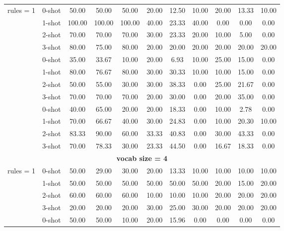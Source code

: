 \begin{table*}[t]
{\begin{tabular}{l c ccc ccc ccc}
           \midrule
           \multirow{4}{*}{rules = 1} & 0-shot & 50.00 & 50.00 & 50.00 & 20.00 & 12.50 & 10.00 & 20.00 & 13.33 & 10.00\\
           & 1-shot & 100.00 & 100.00 & 100.00 & 40.00 & 23.33 & 40.00 & 0.00 & 0.00 & 0.00\\
           & 2-shot & 70.00 & 70.00 & 70.00 & 30.00 & 23.33 & 20.00 & 10.00 & 5.00 & 0.00\\
           & 3-shot & 80.00 & 75.00 & 80.00 & 20.00 & 20.00 & 20.00 & 20.00 & 20.00 & 20.00\\
           \hdashline
           \multirow{4}{*}{rules = 2} &  0-shot & 35.00 & 33.67 & 10.00 & 20.00 & 6.93 & 10.00 & 25.00 & 15.00 & 0.00\\
           & 1-shot & 80.00 & 76.67 & 80.00 & 30.00 & 30.33 & 10.00 & 10.00 & 15.00 & 0.00\\
           & 2-shot & 50.00 & 55.00 & 30.00 & 30.00 & 38.33 & 0.00 & 25.00 & 21.67 & 0.00\\
           & 3-shot & 70.00 & 70.00 & 70.00 & 20.00 & 30.00 & 0.00 & 20.00 & 35.00 & 0.00\\
           \hdashline
          \multirow{4}{*}{rules = 3} & 0-shot & 40.00 & 65.00 & 20.00 & 20.00 & 18.33 & 0.00 & 10.00 & 2.78 & 0.00\\
          & 1-shot & 70.00 & 66.67 & 40.00 & 30.00 & 24.83 & 0.00 & 10.00 & 20.30 & 10.00\\
           & 2-shot & 83.33 & 90.00 & 60.00 & 33.33 & 40.83 & 0.00 & 30.00 & 43.33 & 0.00\\
           & 3-shot & 70.00 & 78.33 & 30.00 & 23.33 & 44.50 & 0.00 & 16.67 & 18.33 & 0.00\\
           \midrule \multicolumn{11}{c}{\textbf{vocab size = 4}} \\
           \midrule
           \multirow{4}{*}{rules = 1} & 0-shot & 50.00 & 29.00 & 30.00 & 20.00 & 13.33 & 10.00 & 10.00 & 10.00 & 10.00\\
           & 1-shot & 50.00 & 50.00 & 50.00 & 50.00 & 50.00 & 50.00 & 20.00 & 15.00 & 20.00\\
           & 2-shot & 60.00 & 60.00 & 60.00 & 10.00 & 10.00 & 10.00 & 20.00 & 20.00 & 20.00\\
           & 3-shot & 20.00 & 20.00 & 20.00 & 30.00 & 25.00 & 30.00 & 20.00 & 20.00 & 20.00\\
           \hdashline
           \multirow{4}{*}{rules = 2} &  0-shot & 50.00 & 50.00 & 10.00 & 20.00 & 15.96 & 0.00 & 0.00 & 0.00 & 0.00\\

\end{tabular}}
\end{table*}
